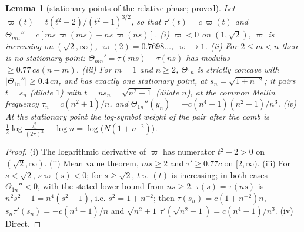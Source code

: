 \documentclass[11pt]{amsart}
\newtheorem{lemma}[theorem]{Lemma}
\theoremstyle{definition}
\theoremstyle{remark}
\begin{document}
\begin{lemma}[stationary points of the relative phase; proved]\label{lem:ext-phase}
Let $\varpi(t)=t(t^2-2)/(t^2-1)^{3/2}$, so that $\tau'(t)=c\,\varpi(t)$ and $\Theta_{mn}''=c[ms\,\varpi(ms)-ns\,\varpi(ns)]$.
\emph{(i)} $\varpi<0$ on $(1,\sqrt2)$, $\varpi$ is increasing on $(\sqrt2,\infty)$, $\varpi(2)=0.7698\ldots$, $\varpi\to1$.
\emph{(ii)} For $2\le m<n$ there is no stationary point: $\Theta_{mn}'=\tau(ms)-\tau(ns)$ has modulus $\ge0.77\,cs(n-m)$.
\emph{(iii)} For $m=1$ and $n\ge2$, $\Theta_{1n}$ is strictly concave with $|\Theta_{1n}''|\ge0.4\,cn$, and has exactly one stationary point,
at $s_n=\sqrt{1+n^{-2}}$; it pairs $t=s_n$ (dilate $1$) with $t=ns_n=\sqrt{n^2+1}$ (dilate $n$), at the common Mellin frequency
$\tau_n=c(n^2+1)/n$, and $\Theta_{1n}''(y_n)=-c(n^4-1)(n^2+1)/n^3$.
\emph{(iv)} At the stationary point the log-symbol weight of the pair after the comb is
$\frac12\log\frac{\tau_n^2}{(2\pi)^2}-\log n=\log\big(N(1+n^{-2})\big)$.
\end{lemma}
\begin{proof}
(i) The logarithmic derivative of $\varpi$ has numerator $t^2+2>0$ on $(\sqrt2,\infty)$. (ii) Mean value theorem, $ms\ge2$ and
$\tau'\ge0.77c$ on $[2,\infty)$. (iii) For $s<\sqrt2$, $s\varpi(s)<0$; for $s\ge\sqrt2$, $t\varpi(t)$ is increasing; in both cases
$\Theta_{1n}''<0$, with the stated lower bound from $ns\ge2$. $\tau(s)=\tau(ns)$ is $n^2s^2-1=n^4(s^2-1)$, i.e. $s^2=1+n^{-2}$; then
$\tau(s_n)=c(1+n^{-2})n$, $s_n\tau'(s_n)=-c(n^4-1)/n$ and $\sqrt{n^2+1}\,\tau'(\sqrt{n^2+1})=c(n^4-1)/n^3$. (iv) Direct.
\end{proof}
\end{document}
